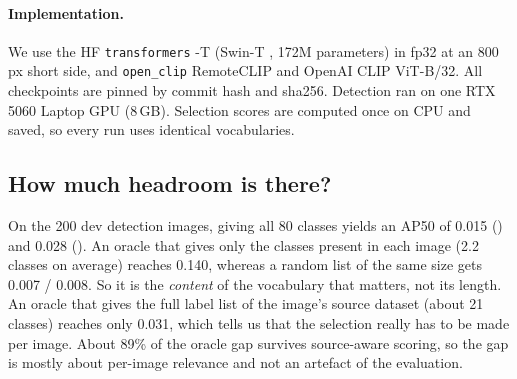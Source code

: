 \paragraph{Implementation.}
We use the HF \texttt{transformers} \gdino-T (Swin-T \cite{liu2021swin}, 172M parameters) in fp32 at an 800\,px short side, and \texttt{open\_clip} RemoteCLIP and OpenAI CLIP ViT-B/32.
All checkpoints are pinned by commit hash and sha256.
Detection ran on one RTX 5060 Laptop GPU (8\,GB).
Selection scores are computed once on CPU and saved, so every run uses identical vocabularies.

\subsection{How much headroom is there?}
\label{sec:exp_headroom}
On the 200 dev detection images, giving \gdino all 80 classes yields an AP50 of 0.015 (\std) and 0.028 (\src).
An oracle that gives only the classes present in each image (2.2 classes on average) reaches 0.140, whereas a random list of the same size gets 0.007 / 0.008.
So it is the \emph{content} of the vocabulary that matters, not its length.
An oracle that gives the full label list of the image's source dataset (about 21 classes) reaches only 0.031, which tells us that the selection really has to be made per image.
About 89\% of the oracle gap survives source-aware scoring, so the gap is mostly about per-image relevance and not an artefact of the evaluation.

